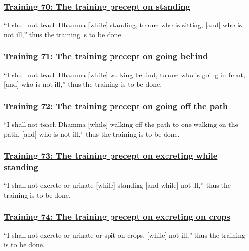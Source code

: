 \subsubsection*{\hyperref[sekh70]{Training 70: The training precept on standing}}
\label{training70}
``I shall not teach Dhamma [while] standing, to one who is sitting, [and] who is not ill,'' thus the training is to be done.



\subsubsection*{\hyperref[sekh71]{Training 71: The training precept on going behind}}
\label{training71}
``I shall not teach Dhamma [while] walking behind, to one who is going in front, [and] who is not ill,'' thus the training is to be done.



\subsubsection*{\hyperref[sekh72]{Training 72: The training precept on going off the path}}
\label{training72}
``I shall not teach Dhamma [while] walking off the path to one walking on the path, [and] who is not ill,'' thus the training is to be done.



\subsubsection*{\hyperref[sekh73]{Training 73: The training precept on excreting while standing}}
\label{training73}
``I shall not excrete or urinate [while] standing [and while] not ill,'' thus the training is to be done.



\subsubsection*{\hyperref[sekh74]{Training 74: The training precept on excreting on crops}}
\label{training74}
``I shall not excrete or urinate or spit on crops, [while] not ill,'' thus the training is to be done.



